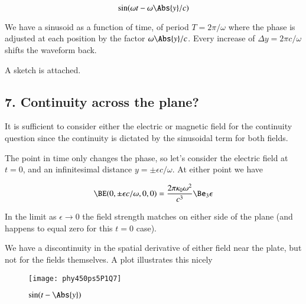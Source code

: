 \begin{equation}\label{eqn:relElectroDynProblemSet5P1:261}
\sin( \omega t - \omega \Abs{y}/c )
\end{equation}

We have a sinusoid as a function of time, of period $T = 2 \pi/\omega$ where the phase is adjusted at each position by the factor $\omega \Abs{y}/c$.  Every increase of $\Delta y = 2 \pi c/\omega$ shifts the waveform back.

A sketch is attached.

\subsection{7. Continuity across the plane?}

It is sufficient to consider either the electric or magnetic field for the continuity question since the continuity is dictated by the sinusoidal term for both fields.

The point in time only changes the phase, so let's consider the electric field at $t=0$, and an infinitesimal distance $y = \pm \epsilon c/\omega$.  At either point we have

\begin{equation}\label{eqn:relElectroDynProblemSet5P1:262}
\BE(0, \pm \epsilon c/\omega, 0, 0) = \frac{ 2 \pi \kappa_0 \omega^2 }{c^3} \Be_3 \epsilon
\end{equation}

In the limit as $\epsilon \rightarrow 0$ the field strength matches on either side of the plane (and happens to equal zero for this $t= 0$ case).

We have a discontinuity in the spatial derivative of either field near the plate, but not for the fields themselves.  A plot illustrates this nicely

\begin{figure}[htp]
\centering
\texttt{[image: phy450ps5P1Q7]}
\caption{$\sin(t - \Abs{y})$}\label{fig:phy450ps5P1Q7}
\end{figure}

